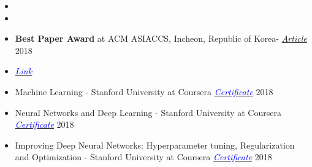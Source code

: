 
\begin{itemize}[noitemsep,topsep=0pt]
	\item {}
	\item {}
	\item \textbf{Best Paper Award} at ACM ASIACCS, Incheon, Republic of Korea- \href{https://www.bu.edu/eng/2018/08/14/best-paper-award-asia-conference-on-computer-and-communication-security-2018/}{ \textit{Article}} 2018
	\item {} \href{https://hdl.handle.net/2144/27051}{\textit{\textcolor{blue}{Link}}}
	\item Machine Learning - Stanford University at Coursera  \href{https://www.coursera.org/account/accomplishments/verify/U5YHWN3XSAQU}{\textit{\textcolor{blue}{Certificate}}} 2018
	\item Neural Networks and Deep Learning - Stanford University at Coursera \href{https://www.coursera.org/account/accomplishments/certificate/ZU26W977NR9P}{\textit{\textcolor{blue}{Certificate}}} 2018\\
	\item Improving Deep Neural Networks: Hyperparameter tuning, Regularization and Optimization - Stanford University at Coursera \href{https://www.coursera.org/account/accomplishments/certificate/U5YHWN3XSAQU}{\textit{\textcolor{blue}{Certificate}}} 2018\\
\end{itemize}
